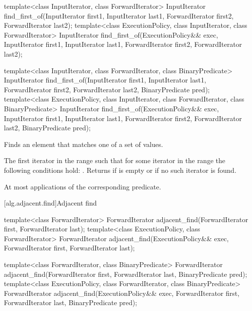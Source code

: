 %
\begin{itemdecl}
template<class InputIterator, class ForwardIterator>
  InputIterator
    find_first_of(InputIterator first1, InputIterator last1,
                  ForwardIterator first2, ForwardIterator last2);
template<class ExecutionPolicy, class InputIterator, class ForwardIterator>
  InputIterator
    find_first_of(ExecutionPolicy&& exec,
                  InputIterator first1, InputIterator last1,
                  ForwardIterator first2, ForwardIterator last2);

template<class InputIterator, class ForwardIterator,
          class BinaryPredicate>
  InputIterator
    find_first_of(InputIterator first1, InputIterator last1,
                  ForwardIterator first2, ForwardIterator last2,
                  BinaryPredicate pred);
template<class ExecutionPolicy, class InputIterator, class ForwardIterator,
         class BinaryPredicate>
  InputIterator
    find_first_of(ExecutionPolicy&& exec,
                  InputIterator first1, InputIterator last1,
                  ForwardIterator first2, ForwardIterator last2,
                  BinaryPredicate pred);
\end{itemdecl}

\begin{itemdescr}
\pnum
\effects
Finds an element that matches one of a set of values.

\pnum
\returns
The first iterator
in the range 
such that for some
iterator
in the range 
the following conditions hold:
.
Returns 
if  is empty or
if no such iterator is found.

\pnum
\complexity
At most
applications of the corresponding predicate.
\end{itemdescr}

[alg.adjacent.find]{Adjacent find}

%
\begin{itemdecl}
template<class ForwardIterator>
  ForwardIterator adjacent_find(ForwardIterator first, ForwardIterator last);
template<class ExecutionPolicy, class ForwardIterator>
  ForwardIterator adjacent_find(ExecutionPolicy&& exec,
                                ForwardIterator first, ForwardIterator last);

template<class ForwardIterator, class BinaryPredicate>
  ForwardIterator adjacent_find(ForwardIterator first, ForwardIterator last,
                                BinaryPredicate pred);
template<class ExecutionPolicy, class ForwardIterator, class BinaryPredicate>
  ForwardIterator adjacent_find(ExecutionPolicy&& exec,
                                ForwardIterator first, ForwardIterator last,
                                BinaryPredicate pred);
\end{itemdecl}

